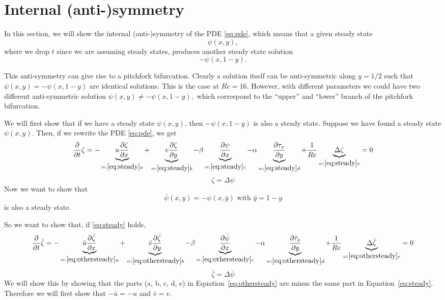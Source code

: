 \section{Internal (anti-)symmetry}

In this section, we will show the internal (anti-)symmetry of the PDE \eqref{eq:pde}, which means that a given steady state $$\psi(x, y),$$ where we drop $t$ since we are assuming steady states, produces another steady state solution $$-\psi(x, 1 - y).$$

This anti-symmetry can give rise to a pitchfork bifurcation. Clearly a solution itself can be anti-symmetric along $y = 1/2$ such that $\psi(x,y)=-\psi(x,1 - y)$ are identical solutions. This is the case at $Re=16.$ However, with different parameters we could have two different anti-symmetric solution $\psi(x,y) \neq -\psi(x,1 - y),$ which correspond to the ``upper'' and ``lower'' branch of the pitchfork bifurcation.

We will first show that if we have a steady state $\psi(x,y)$, then $-\psi(x,1-y)$ is also a steady state. Suppose we have found a steady state $\psi(x,y)$. Then, if we rewrite the PDE \ref{eq:pde}, we get
 \begin{equation}
   \frac{\partial}{\partial t}\zeta= - \underbrace{   u \frac{\partial\zeta}{\partial x}}_{=:\ref{eq:steady} a} +\underbrace{  v \frac{\partial\zeta}{\partial y}}_{=:\ref{eq:steady}b} - \beta \underbrace{\frac{\partial \psi}{\partial x} }_{=:\ref{eq:steady}c} - \alpha\underbrace{ \frac{\partial \tau_x}{\partial y}}_{=:\ref{eq:steady} d} +\frac{1}{Re}  \underbrace{\Delta \zeta}_{=:\ref{eq:steady}e}=0\label{eq:steady}
\end{equation}
 $$\zeta=\Delta \psi $$
Now we want to show that 
$$\bar{\psi}(x,y)=-\psi(x,\bar{y}) \text{ with }\bar{y}=1-y$$
is also a steady state.

So we want to show that, if \eqref{eq:steady} holds, 
 \begin{equation} \frac{\partial}{\partial t}\bar{\zeta}=- \underbrace{  \bar u \frac{\partial\bar{\zeta}}{\partial x}}_{=:\ref{eq:othersteady} a} +\underbrace{ \bar v \frac{\partial\bar{\zeta}}{\partial y}}_{=:\ref{eq:othersteady}b} -\beta \underbrace{ \frac{\partial \bar{\psi}}{\partial x} }_{=:\ref{eq:othersteady}c} -\alpha  \underbrace{\frac{\partial \bar \tau_x}{\partial y}}_{=:\ref{eq:othersteady}d} + \frac{1}{Re} \underbrace{\Delta \bar{\zeta}}_{=:\ref{eq:othersteady}e}=0 \label{eq:othersteady}
 \end{equation}
 $$\bar{\zeta}=\Delta \bar{\psi}$$ 
We will show this by showing that the parts (a, b, c, d, e) in Equation~\eqref{eq:othersteady} are minus the same part in Equation~\eqref{eq:steady}. Therefore we will first show that $-\bar{u}=-u$ and $\bar{v}=v$. 
 
